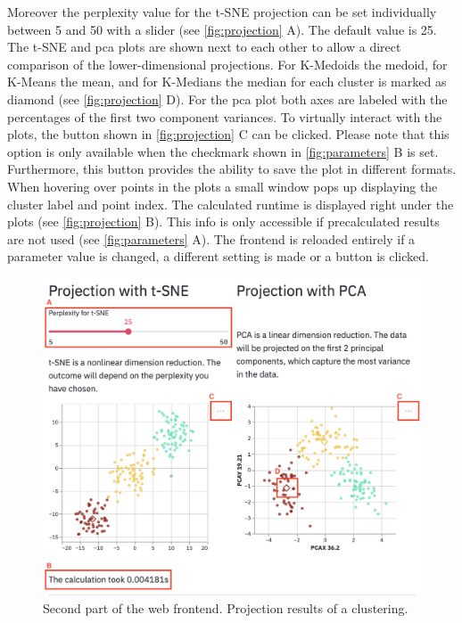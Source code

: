 \documentclass[12pt, english]{article}
\begin{document}
Moreover the perplexity value for the t-SNE projection can be set individually between 5 and 50 with a slider (see \autoref{fig:projection} A). The default value is 25. The t-SNE and pca plots are shown next to each other to allow a direct comparison of the lower-dimensional projections. For K-Medoids the medoid, for K-Means the mean, and for K-Medians the median for each cluster is marked as diamond (see \autoref{fig:projection} D). For the pca plot both axes are labeled with the percentages of the first two component variances. To virtually interact with the plots, the button shown in \autoref{fig:projection} C can be clicked. Please note that this option is only available when the checkmark shown in \autoref{fig:parameters} B is set. Furthermore, this button provides the ability to save the plot in different formats.
When hovering over points in the plots a small window pops up displaying the cluster label and point index.
The calculated runtime is displayed right under the plots (see \autoref{fig:projection} B). This info is only accessible if precalculated results are not used (see \autoref{fig:parameters} A).
The frontend is reloaded entirely if a parameter value is changed, a different setting is made or a button is clicked. 
\begin{figure}[H]
	\centering
	\includegraphics[width=\linewidth]{modules/web_frontend/projection_letters}
	\caption{Second part of the web frontend. Projection results of a clustering.}\label{fig:projection}
\end{figure}
\end{document}
